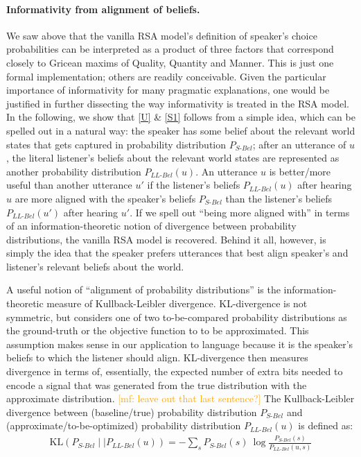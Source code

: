 \documentclass{sp}
\newcommand{\mf}[1]{\textcolor{orange}{[mf: #1]}}
\begin{document}
\paragraph{Informativity from alignment of beliefs.} We saw above that the vanilla RSA
model's definition of speaker's choice probabilities can be interpreted as a product of three
factors that correspond closely to Gricean maxims of Quality, Quantity and Manner. 
This is just one formal implementation; others are readily conceivable. Given the particular
importance of informativity for many pragmatic explanations, one would be justified in further dissecting
the way informativity is treated in the RSA model. In the following, we show that \eqref{U} \&
\eqref{S1} follows from a simple idea, which can be spelled out in a natural way: the speaker has some
belief about the relevant world states that gets captured in probability distribution $P_{S\text{-}Bel}$;
after an utterance of $u$, the literal listener's beliefs about the relevant world states are
represented as another probability distribution $P_{LL\text{-}Bel}(u)$. An utterance $u$ is better/more useful
than another utterance $u'$ if the listener's beliefs $P_{LL\text{-}Bel}(u)$ after hearing $u$ are
more aligned with the speaker's beliefs $P_{S\text{-}Bel}$ than the listener's beliefs
$P_{LL\text{-}Bel}(u')$ after hearing $u'$. If we spell out ``being more aligned with'' in terms of an
information-theoretic notion of divergence between probability distributions, the vanilla RSA
model is recovered. Behind it all, however, is simply the idea that the speaker prefers
utterances that best align speaker's and listener's relevant beliefs about the world.

A useful notion of ``alignment of probability distributions'' is the information-theoretic
measure of Kullback-Leibler divergence. KL-divergence is not symmetric, but considers one of
two to-be-compared probability distributions as the ground-truth or the objective function to
to be approximated. This assumption makes sense in our application to language because it is the speaker's
beliefs to which the listener should align. KL-divergence then measures divergence in terms of,
essentially, the expected number of extra bits needed to encode a signal that was generated
from the true distribution with the approximate distribution. \mf{leave out that last
  sentence?} The Kullback-Leibler divergence between (baseline/true) probability distribution
$P_{S\text{-}Bel}$ and (approximate/to-be-optimized) probability distribution
$P_{LL\text{-}Bel}(u)$ is defined as:
\begin{align}
  \label{eq:KL-divergence}
  \text{KL}(P_{S\text{-}Bel} \mid \mid P_{LL\text{-}Bel}(u)) = - \sum_{s} P_{S\text{-}Bel}(s) \ \log \frac{P_{S\text{-}Bel}(s)}{P_{LL\text{-}Bel}(u,s)}
\end{align}
\end{document}
